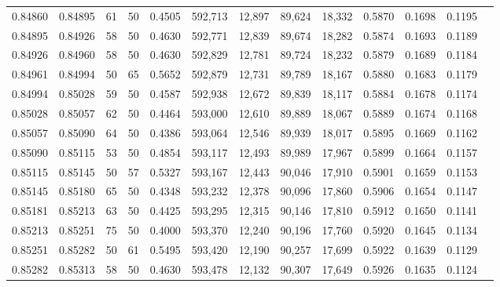 \begin{tabular}{rrrrrrrrrrrrr}
0.84860 & 0.84895 &    61 &  50 &                                     0.4505 & 592,713 &  12,897 &  89,624 &  18,332 & 0.5870 & 0.1698 & 0.1195 \\
0.84895 & 0.84926 &    58 &  50 &                                     0.4630 & 592,771 &  12,839 &  89,674 &  18,282 & 0.5874 & 0.1693 & 0.1189 \\
0.84926 & 0.84960 &    58 &  50 &                                     0.4630 & 592,829 &  12,781 &  89,724 &  18,232 & 0.5879 & 0.1689 & 0.1184 \\
0.84961 & 0.84994 &    50 &  65 &                                     0.5652 & 592,879 &  12,731 &  89,789 &  18,167 & 0.5880 & 0.1683 & 0.1179 \\
0.84994 & 0.85028 &    59 &  50 &                                     0.4587 & 592,938 &  12,672 &  89,839 &  18,117 & 0.5884 & 0.1678 & 0.1174 \\
0.85028 & 0.85057 &    62 &  50 &                                     0.4464 & 593,000 &  12,610 &  89,889 &  18,067 & 0.5889 & 0.1674 & 0.1168 \\
0.85057 & 0.85090 &    64 &  50 &                                     0.4386 & 593,064 &  12,546 &  89,939 &  18,017 & 0.5895 & 0.1669 & 0.1162 \\
0.85090 & 0.85115 &    53 &  50 &                                     0.4854 & 593,117 &  12,493 &  89,989 &  17,967 & 0.5899 & 0.1664 & 0.1157 \\
0.85115 & 0.85145 &    50 &  57 &                                     0.5327 & 593,167 &  12,443 &  90,046 &  17,910 & 0.5901 & 0.1659 & 0.1153 \\
0.85145 & 0.85180 &    65 &  50 &                                     0.4348 & 593,232 &  12,378 &  90,096 &  17,860 & 0.5906 & 0.1654 & 0.1147 \\
0.85181 & 0.85213 &    63 &  50 &                                     0.4425 & 593,295 &  12,315 &  90,146 &  17,810 & 0.5912 & 0.1650 & 0.1141 \\
0.85213 & 0.85251 &    75 &  50 &                                     0.4000 & 593,370 &  12,240 &  90,196 &  17,760 & 0.5920 & 0.1645 & 0.1134 \\
0.85251 & 0.85282 &    50 &  61 &                                     0.5495 & 593,420 &  12,190 &  90,257 &  17,699 & 0.5922 & 0.1639 & 0.1129 \\
0.85282 & 0.85313 &    58 &  50 &                                     0.4630 & 593,478 &  12,132 &  90,307 &  17,649 & 0.5926 & 0.1635 & 0.1124 \\

\end{tabular}
